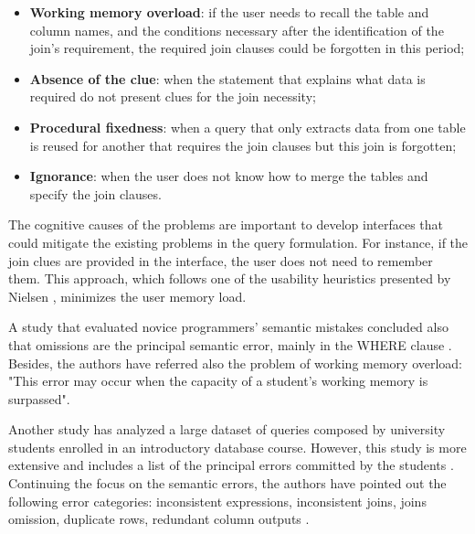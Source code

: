 \begin{itemize}
  \item \textbf{Working memory overload}: if the user needs to recall the table and column names, and the conditions necessary after the identification of the join's requirement, the required join clauses could be forgotten in this period;
  \item \textbf{Absence of the clue}: when the statement that explains what data is required do not present clues for the join necessity;
  \item \textbf{Procedural fixedness}: when a query that only extracts data from one table is reused for another that requires the join clauses but this join is forgotten;
  \item \textbf{Ignorance}:  when the user does not know how to merge the tables and specify the join clauses.
\end{itemize}

The cognitive causes of the problems are important to develop interfaces that could mitigate the existing problems in the query formulation. For instance, if the join clues are provided in the interface, the user does not need to remember them. This approach, which follows one of the usability heuristics presented by Nielsen \cite{usabilityEngineering}, minimizes the user memory load.

A study that evaluated novice programmers' semantic mistakes concluded also that omissions are the principal semantic error, mainly in the WHERE clause \cite{studentsSemanticMistakesInWritingSevenDifferentTypesOfSQLQueries}. Besides, the authors have referred also the problem of working memory overload: "This error may occur when the capacity of a student’s working memory is surpassed".

Another study has analyzed a large dataset of queries composed by university students enrolled in an introductory database course. However, this study is more extensive and includes a list of the principal errors committed by the students \cite{errorsAndComplicationsInSQLQueryFormulation}. Continuing the focus on the semantic errors, the authors have pointed out the following error categories: inconsistent expressions, inconsistent joins, joins omission, duplicate rows, redundant column outputs \cite{errorsAndComplicationsInSQLQueryFormulation}.


